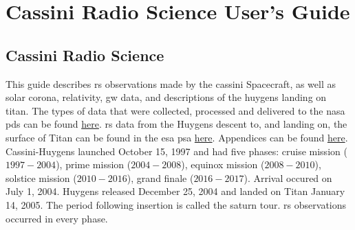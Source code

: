 \documentclass{article}
\begin{document}
    \section{Cassini Radio Science User's Guide}
        \label{sec:usrguide}
        \subsection{Cassini Radio Science}
            \label{subsec:usr_cassini_radio_science}
            This guide describes \gls{rs} observations made
            by the \gls{cassini} Spacecraft, as well
            as \gls{solar corona}, \gls{relativity},
            \gls{gw} data, and descriptions of the
            \gls{huygens} landing on \gls{titan}. The types
            of data that were collected, processed and
            delivered to the \gls{nasa} \gls{pds} can be
            found \href{http://pds-atmospheres.nmsu.edu/}{here}.
            \gls{rs} data from the Huygens descent to,
            and landing on, the surface of Titan can be found
            in the \gls{esa} \gls{psa}
            \href{https://www.cosmos.esa.int/?%
                  project=PSA&page=huygens}{here}.
            Appendices can be found
            \href{https://radioscience.jpl.nasa.gov/%
                  publications/index.html}{here}.
            Cassini-Huygens launched October 15, 1997 and had
            five phases: \Gls{cruise mission} ($1997\!-\!2004$),
            \gls{prime mission} ($2004\! -\! 2008$),
            \gls{equinox mission} ($2008\! -\! 2010$),
            \gls{solstice mission} ($2010\! -\! 2016$),
            \gls{grand finale} ($2016\! - \!2017$).
            Arrival occured on July 1, 2004. Huygens
            released December 25, 2004 and landed on Titan
            January 14, 2005. The period following insertion
            is called the \gls{saturn tour}.
            \gls{rs} observations occurred in every phase.
\end{document}
